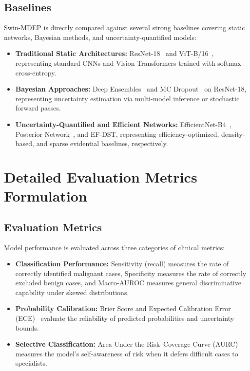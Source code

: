 \documentclass[letterpaper]{article} %
\begin{document}
\subsection{Baselines}\label{subsec:baselines}

Swin-MDEP is directly compared against several strong baselines covering static networks, Bayesian methods, and uncertainty-quantified models:
\begin{itemize}
    \item \textbf{Traditional Static Architectures:} ResNet-18~\cite{he2016deep} and ViT-B/16~\cite{dosovitskiy2021image}, representing standard CNNs and Vision Transformers trained with softmax cross-entropy.
    \item \textbf{Bayesian Approaches:} Deep Ensembles~\cite{lakshminarayanan2017simple} and MC Dropout~\cite{gal2016dropout} on ResNet-18, representing uncertainty estimation via multi-model inference or stochastic forward passes.
    \item \textbf{Uncertainty-Quantified and Efficient Networks:} EfficientNet-B4~\cite{tan2019efficientnet}, Posterior Network~\cite{charpentier2020posterior}, and EF-DST, representing efficiency-optimized, density-based, and sparse evidential baselines, respectively.
\end{itemize}


\section{Detailed Evaluation Metrics Formulation}
\subsection{Evaluation Metrics}\label{subsec:metrics}

Model performance is evaluated across three categories of clinical metrics:
\begin{itemize}
    \item \textbf{Classification Performance:} Sensitivity (recall) measures the rate of correctly identified malignant cases, Specificity measures the rate of correctly excluded benign cases, and Macro-AUROC measures general discriminative capability under skewed distributions.
    \item \textbf{Probability Calibration:} Brier Score and Expected Calibration Error (ECE)~\cite{naeini2015obtaining} evaluate the reliability of predicted probabilities and uncertainty bounds.
    \item \textbf{Selective Classification:} Area Under the Risk--Coverage Curve (AURC)~\cite{geifman2017selective, geifman2019selectivenet, jaeger2023call} measures the model's self-awareness of risk when it defers difficult cases to specialists.
\end{itemize}
\end{document}
